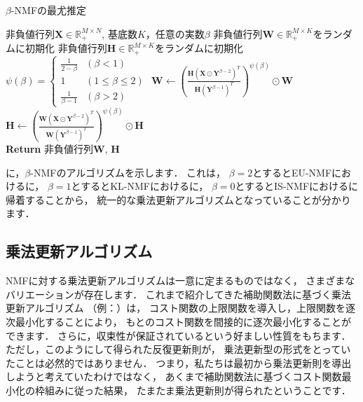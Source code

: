 \begin{algobox}{$\beta$-NMFの最尤推定}
\label{algo:beta-nmf-ml}
\begin{algorithmic}[1]
\Require 非負値行列$\bm{X} \in \mathbb{R}_+^{M \times N}$, 基底数$K$，任意の実数$\beta$
\State 非負値行列$\bm{W} \in \mathbb{R}_+^{M \times K}$をランダムに初期化
\State 非負値行列$\bm{H} \in \mathbb{R}_+^{M \times K}$をランダムに初期化
\State $\psi(\beta) 
= 
\left\{
\begin{array}{ll}
\frac{1}{2 - \beta} & (\beta < 1)
\\
1 &  (1 \le \beta \le 2)
\\
\frac{1}{\beta - 1} & (\beta > 2)
\end{array}
\right.$
\State $\displaystyle \bm{W} \gets 
\left(
\frac{\bm{H} \left(\bm{X} \odot \bm{Y}^{\beta - 2}\right)^T}
                  {\bm{H} \left(\bm{Y}^{\beta - 1}\right)^T}
\right)^{\psi(\beta)}
 \odot \bm{W}$ 
\State $\displaystyle \bm{H} \gets 
\left(
\frac{\bm{W} \left(\bm{X} \odot \bm{Y}^{\beta - 2}\right)^T}
                  {\bm{W} \left(\bm{Y}^{\beta - 1}\right)^T}
\right)^{\psi(\beta)}
 \odot \bm{H}$ 
\EndWhile\\
{\bf Return} 非負値行列$\bm{W}$, $\bm{H}$
\end{algorithmic}
\end{algobox}

に，$\beta$-NMFのアルゴリズムを示します．
これは，
$\beta=2$とするとEU-NMFにおけるに，
$\beta=1$とするとKL-NMFにおけるに，
$\beta=0$とするとIS-NMFにおけるに帰着することから，
統一的な乗法更新アルゴリズムとなっていることが分かります．

\subsection{乗法更新アルゴリズム}

NMFに対する乗法更新アルゴリズムは一意に定まるものではなく，
さまざまなバリエーションが存在します．
これまで紹介してきた補助関数法に基づく乗法更新アルゴリズム
（例：）は，
コスト関数の上限関数を導入し，上限関数を逐次最小化することにより，
もとのコスト関数を間接的に逐次最小化することができます．
さらに，収束性が保証されているという好ましい性質をもちます．
ただし，このようにして得られた反復更新則が，
乗法更新型の形式をとっていたことは必然的ではありません．
つまり，私たちは最初から乗法更新則を導出しようと考えていたわけではなく，
あくまで補助関数法に基づくコスト関数最小化の枠組みに従った結果，
たまたま乗法更新則が得られたということです．

